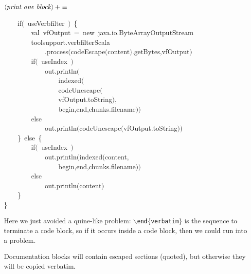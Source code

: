 \documentclass[a4paper,12pt]{article}
\begin{document}
$\left<\mbox{\emph{print one block}}\right>+\equiv$
\begin{program}~~~~{\vem if}$($~useVerbfilter~$)$~{\small\{}
\\~~~~~~~~{\vem val}~vfOutput~=~{\vem new}~java.io.ByteArrayOutputStream
\\~~~~~~~~toolsupport.verbfilterScala
\\~~~~~~~~~~~~.process$($codeEscape$($content$)$.getBytes,vfOutput$)$
\\~~~~~~~~{\vem if}$($~useIndex~$)$
\\~~~~~~~~~~~~out.println$($
\\~~~~~~~~~~~~~~~~indexed$($
\\~~~~~~~~~~~~~~~~codeUnescape$($
\\~~~~~~~~~~~~~~~~vfOutput.toString$)$,
\\~~~~~~~~~~~~~~~~begin,end,chunks.filename$)$$)$
\\~~~~~~~~{\vem else}
\\~~~~~~~~~~~~out.println$($codeUnescape$($vfOutput.toString$)$$)$
\\~~~~{\small\}}~{\vem else}~{\small\{}
\\~~~~~~~~{\vem if}$($~useIndex~$)$
\\~~~~~~~~~~~~out.println$($indexed$($content,
\\~~~~~~~~~~~~~~~~begin,end,chunks.filename$)$$)$
\\~~~~~~~~{\vem else}
\\~~~~~~~~~~~~out.println$($content$)$
\\~~~~{\small\}}
\\{\small\}}
\\[0.5em]\end{program}
Here we just avoided a quine-like problem: \texttt{$\backslash$end$\{$verbatim$\}$} is the sequence
to terminate a code block, so if it occurs inside a code block, then we could
run into a problem.

Documentation blocks will contain escaped sections (quoted), but otherwise
they will be copied verbatim.
\end{document}
